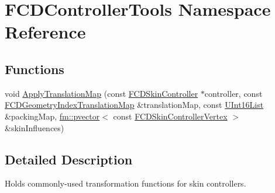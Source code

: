 \hypertarget{namespaceFCDControllerTools}{
\section{FCDControllerTools Namespace Reference}
\label{namespaceFCDControllerTools}
}
\subsection*{Functions}
\begin{DoxyCompactItemize}
\item 
void \hyperlink{namespaceFCDControllerTools_a83e6026ea91b4495fc0faf58a7b5b6fa}{ApplyTranslationMap} (const \hyperlink{classFCDSkinController}{FCDSkinController} $\ast$controller, const \hyperlink{classfm_1_1map}{FCDGeometryIndexTranslationMap} \&translationMap, const \hyperlink{classfm_1_1vector}{UInt16List} \&packingMap, \hyperlink{classfm_1_1pvector}{fm::pvector}$<$ const \hyperlink{classFCDSkinControllerVertex}{FCDSkinControllerVertex} $>$ \&skinInfluences)
\end{DoxyCompactItemize}


\subsection{Detailed Description}
Holds commonly-\/used transformation functions for skin controllers. 

